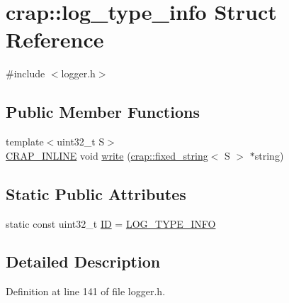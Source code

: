 \hypertarget{structcrap_1_1log__type__info}{\section{crap\+:\+:log\+\_\+type\+\_\+info Struct Reference}
\label{structcrap_1_1log__type__info}
}


{\ttfamily \#include $<$logger.\+h$>$}

\subsection*{Public Member Functions}
\begin{DoxyCompactItemize}
\item 
{\footnotesize template$<$uint32\+\_\+t S$>$ }\\\hyperlink{config__x86_8h_a5a40526b8d842e7ff731509998bb0f1c}{C\+R\+A\+P\+\_\+\+I\+N\+L\+I\+N\+E} void \hyperlink{structcrap_1_1log__type__info_ade1f38f5e14847c98ccbbdc2fb2305b2}{write} (\hyperlink{classcrap_1_1fixed__string}{crap\+::fixed\+\_\+string}$<$ S $>$ $\ast$string)
\end{DoxyCompactItemize}
\subsection*{Static Public Attributes}
\begin{DoxyCompactItemize}
\item 
static const uint32\+\_\+t \hyperlink{structcrap_1_1log__type__info_a6b5efdde42f7d1204fdefb9b70816a91}{I\+D} = \hyperlink{logger_8h_a8b181b7eaaab11e988e2c6b7cdc0d80a}{L\+O\+G\+\_\+\+T\+Y\+P\+E\+\_\+\+I\+N\+F\+O}
\end{DoxyCompactItemize}


\subsection{Detailed Description}


Definition at line 141 of file logger.\+h.



